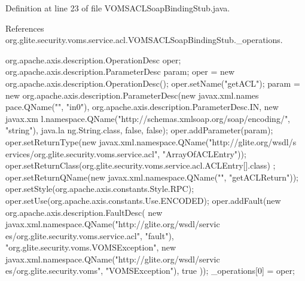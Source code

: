 Definition at line 23 of file VOMSACLSoapBindingStub.java.



References org.glite.security.voms.service.acl.VOMSACLSoapBindingStub.\_\-operations.


\begin{DoxyCode}
                                             {
        org.apache.axis.description.OperationDesc oper;
        org.apache.axis.description.ParameterDesc param;
        oper = new org.apache.axis.description.OperationDesc();
        oper.setName("getACL");
        param = new org.apache.axis.description.ParameterDesc(new javax.xml.names
      pace.QName("", "in0"), org.apache.axis.description.ParameterDesc.IN, new javax.xm
      l.namespace.QName("http://schemas.xmlsoap.org/soap/encoding/", "string"), java.la
      ng.String.class, false, false);
        oper.addParameter(param);
        oper.setReturnType(new javax.xml.namespace.QName("http://glite.org/wsdl/s
      ervices/org.glite.security.voms.service.acl", "ArrayOfACLEntry"));
        oper.setReturnClass(org.glite.security.voms.service.acl.ACLEntry[].class)
      ;
        oper.setReturnQName(new javax.xml.namespace.QName("", "getACLReturn"));
        oper.setStyle(org.apache.axis.constants.Style.RPC);
        oper.setUse(org.apache.axis.constants.Use.ENCODED);
        oper.addFault(new org.apache.axis.description.FaultDesc(
                      new javax.xml.namespace.QName("http://glite.org/wsdl/servic
      es/org.glite.security.voms.service.acl", "fault"),
                      "org.glite.security.voms.VOMSException",
                      new javax.xml.namespace.QName("http://glite.org/wsdl/servic
      es/org.glite.security.voms", "VOMSException"), 
                      true
                     ));
        _operations[0] = oper;

}
\end{DoxyCode}

